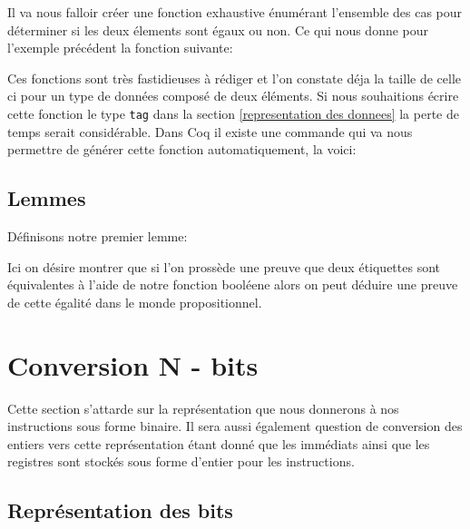 \documentclass {article}
\newcommand{\codefrom}[3]
           {}
\theoremstyle{definition}
\theoremstyle{remark}
\newcommand{\fun}[1]{\lstinline!#1!}
\begin{document}
Il va nous falloir créer une fonction exhaustive énumérant l'ensemble des cas pour déterminer
si les deux élements sont égaux ou non. Ce qui nous donne pour l'exemple précédent la fonction suivante:

\codefrom{rapport}{definitions}{equal}

Ces fonctions sont très fastidieuses à rédiger et l'on constate déja la taille de celle ci
pour un type de données composé de deux éléments.
Si nous souhaitions écrire cette fonction le type \fun{tag} dans
la section \ref{representation des donnees} la perte de temps serait considérable.
Dans Coq il existe une commande qui va nous permettre de générer cette fonction
automatiquement, la voici:

\codefrom{rapport}{definitions}{SchemeEqual}



\subsection{Lemmes}
\label{LemmesAST}
Définisons notre premier lemme:
\codefrom{src}{ast_instructions}{tag_beq_different}
Ici on désire montrer que si l'on prossède une preuve que deux étiquettes sont équivalentes
à l'aide de notre fonction booléene alors on peut déduire une preuve
de cette égalité dans le monde propositionnel.








\section{Conversion N - bits}
\label{Section Conversion N liste B}

Cette section s'attarde sur la représentation que nous donnerons à nos instructions
sous forme binaire. Il sera aussi également question de conversion des entiers vers cette
représentation étant donné que les immédiats ainsi que les registres sont stockés sous forme d'entier
pour les instructions.



\subsection{Représentation des bits}
\end{document}

